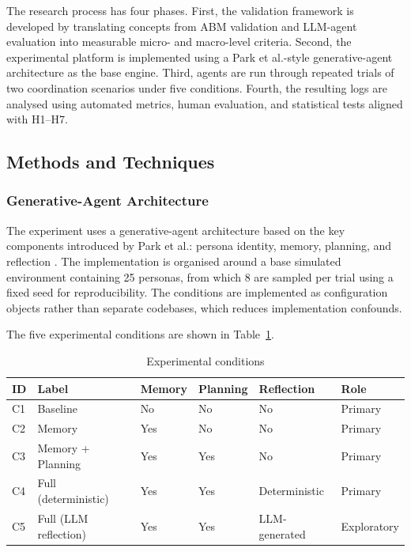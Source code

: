 \documentclass[11pt]{article}
\begin{document}
The research process has four phases. First, the validation framework is developed by translating concepts from ABM validation and LLM-agent evaluation into measurable micro- and macro-level criteria. Second, the experimental platform is implemented using a Park et al.-style generative-agent architecture as the base engine. Third, agents are run through repeated trials of two coordination scenarios under five conditions. Fourth, the resulting logs are analysed using automated metrics, human evaluation, and statistical tests aligned with H1--H7.

\subsection{Methods and Techniques}

\subsubsection{Generative-Agent Architecture}
The experiment uses a generative-agent architecture based on the key components introduced by Park et al.: persona identity, memory, planning, and reflection \cite{park2023generative}. The implementation is organised around a base simulated environment containing 25 personas, from which 8 are sampled per trial using a fixed seed for reproducibility. The conditions are implemented as configuration objects rather than separate codebases, which reduces implementation confounds.

The five experimental conditions are shown in Table~\ref{tab:conditions}.

\begin{table}[h]
\centering
\caption{Experimental conditions}
\label{tab:conditions}
\begin{tabular}{llllll}
\toprule
ID & Label & Memory & Planning & Reflection & Role \\
\midrule
C1 & Baseline & No & No & No & Primary \\
C2 & Memory & Yes & No & No & Primary \\
C3 & Memory + Planning & Yes & Yes & No & Primary \\
C4 & Full (deterministic) & Yes & Yes & Deterministic & Primary \\
C5 & Full (LLM reflection) & Yes & Yes & LLM-generated & Exploratory \\
\bottomrule
\end{tabular}
\end{table}
\end{document}
